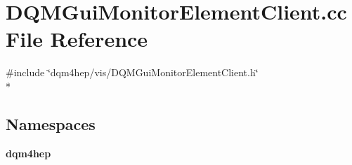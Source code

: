 \section{D\+Q\+M\+Gui\+Monitor\+Element\+Client.\+cc File Reference}
\label{DQMGuiMonitorElementClient_8cc}
{\ttfamily \#include \char`\"{}dqm4hep/vis/\+D\+Q\+M\+Gui\+Monitor\+Element\+Client.\+h\char`\"{}}\\*
\subsection*{Namespaces}
\begin{DoxyCompactItemize}
\item 
 {\bf dqm4hep}
\end{DoxyCompactItemize}
